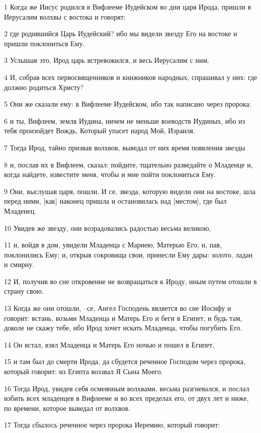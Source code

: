\par 1 Когда же Иисус родился в Вифлееме Иудейском во дни царя Ирода, пришли в Иерусалим волхвы с востока и говорят:
\par 2 где родившийся Царь Иудейский? ибо мы видели звезду Его на востоке и пришли поклониться Ему.
\par 3 Услышав это, Ирод царь встревожился, и весь Иерусалим с ним.
\par 4 И, собрав всех первосвященников и книжников народных, спрашивал у них: где должно родиться Христу?
\par 5 Они же сказали ему: в Вифлееме Иудейском, ибо так написано через пророка:
\par 6 и ты, Вифлеем, земля Иудина, ничем не меньше воеводств Иудиных, ибо из тебя произойдет Вождь, Который упасет народ Мой, Израиля.
\par 7 Тогда Ирод, тайно призвав волхвов, выведал от них время появления звезды
\par 8 и, послав их в Вифлеем, сказал: пойдите, тщательно разведайте о Младенце и, когда найдете, известите меня, чтобы и мне пойти поклониться Ему.
\par 9 Они, выслушав царя, пошли. И се, звезда, которую видели они на востоке, шла перед ними, [как] наконец пришла и остановилась над [местом], где был Младенец.
\par 10 Увидев же звезду, они возрадовались радостью весьма великою,
\par 11 и, войдя в дом, увидели Младенца с Мариею, Матерью Его, и, пав, поклонились Ему; и, открыв сокровища свои, принесли Ему дары: золото, ладан и смирну.
\par 12 И, получив во сне откровение не возвращаться к Ироду, иным путем отошли в страну свою.
\par 13 Когда же они отошли, --се, Ангел Господень является во сне Иосифу и говорит: встань, возьми Младенца и Матерь Его и беги в Египет, и будь там, доколе не скажу тебе, ибо Ирод хочет искать Младенца, чтобы погубить Его.
\par 14 Он встал, взял Младенца и Матерь Его ночью и пошел в Египет,
\par 15 и там был до смерти Ирода, да сбудется реченное Господом через пророка, который говорит: из Египта воззвал Я Сына Моего.
\par 16 Тогда Ирод, увидев себя осмеянным волхвами, весьма разгневался, и послал избить всех младенцев в Вифлееме и во всех пределах его, от двух лет и ниже, по времени, которое выведал от волхвов.
\par 17 Тогда сбылось реченное через пророка Иеремию, который говорит:
